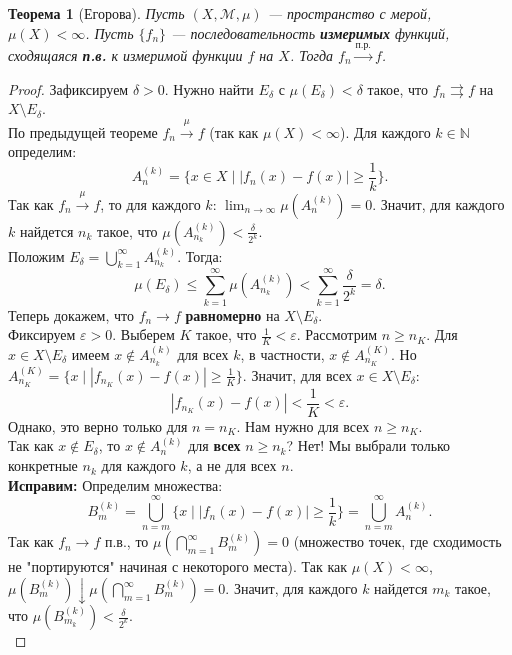 \documentclass[a4paper, 12pt]{article}
\newtheorem{theorem}{Теорема}
\newcommand{\N}{\mathbb{N}}
\newcommand{\1}{\mathbf{1}}
\begin{document}
\begin{theorem}[Егорова]
    Пусть $(X, \mathcal{M}, \mu)$ — пространство с мерой, \textbf{$\mu(X) < \infty$}. Пусть $\{f_n\}$ — последовательность \textbf{измеримых} функций, сходящаяся \textbf{п.в.} к измеримой функции $f$ на $X$. Тогда $f_n \xrightarrow{\text{п.р.}} f$.
\end{theorem}

\begin{proof}
    Зафиксируем $\delta > 0$. Нужно найти $E_\delta$ с $\mu(E_\delta) < \delta$ такое, что $f_n \rightrightarrows f$ на $X \setminus E_\delta$. \\
    По предыдущей теореме $f_n \xrightarrow{\mu} f$ (так как $\mu(X) < \infty$). Для каждого $k \in \N$ определим:
    \[
    A_n^{(k)} = \{x \in X \mid |f_n(x) - f(x)| \geq \frac{1}{k}\}.
    \]
    Так как $f_n \xrightarrow{\mu} f$, то для каждого $k$: $\lim_{n \to \infty} \mu(A_n^{(k)}) = 0$. Значит, для каждого $k$ найдется $n_k$ такое, что $\mu(A_{n_k}^{(k)}) < \frac{\delta}{2^k}$. \\
    Положим $E_\delta = \bigcup_{k=1}^{\infty} A_{n_k}^{(k)}$. Тогда:
    \[
    \mu(E_\delta) \leq \sum_{k=1}^{\infty} \mu(A_{n_k}^{(k)}) < \sum_{k=1}^{\infty} \frac{\delta}{2^k} = \delta.
    \]
    Теперь докажем, что $f_n \to f$ \textbf{равномерно} на $X \setminus E_\delta$. \\
    Фиксируем $\varepsilon > 0$. Выберем $K$ такое, что $\frac{1}{K} < \varepsilon$. Рассмотрим $n \geq n_K$. Для $x \in X \setminus E_\delta$ имеем $x \notin A_{n_k}^{(k)}$ для всех $k$, в частности, $x \notin A_{n_K}^{(K)}$. Но $A_{n_K}^{(K)} = \{x \mid |f_{n_K}(x) - f(x)| \geq \frac{1}{K}\}$. Значит, для всех $x \in X \setminus E_\delta$:
    \[
    |f_{n_K}(x) - f(x)| < \frac{1}{K} < \varepsilon.
    \]
    Однако, это верно только для $n = n_K$. Нам нужно для всех $n \geq n_K$. \\
    Так как $x \notin E_\delta$, то $x \notin A_n^{(k)}$ для \textbf{всех} $n \geq n_k$? Нет! Мы выбрали только конкретные $n_k$ для каждого $k$, а не для всех $n$. \\
    \textbf{Исправим:} Определим множества:
    \[
    B_m^{(k)} = \bigcup_{n=m}^{\infty} \{x \mid |f_n(x) - f(x)| \geq \frac{1}{k}\} = \bigcup_{n=m}^{\infty} A_n^{(k)}.
    \]
    Так как $f_n \to f$ п.в., то $\mu(\bigcap_{m=1}^{\infty} B_m^{(k)}) = 0$ (множество точек, где сходимость не "портируются" начиная с некоторого места). Так как $\mu(X) < \infty$, $\mu(B_m^{(k)}) \downarrow \mu(\bigcap_{m=1}^{\infty} B_m^{(k)}) = 0$. Значит, для каждого $k$ найдется $m_k$ такое, что $\mu(B_{m_k}^{(k)}) < \frac{\delta}{2^k}$. \\

\end{proof}
\end{document}
